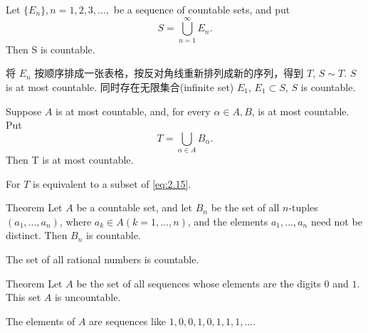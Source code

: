 
\begin{thm}\label{thm:2.12 countable set}
    Let $\{E_n\}, n=1,2,3,...,$ be a sequence of countable sets, and put
    \begin{equation}\label{eq:2.15}
        S = \bigcup_{n=1}^{\infty} E_n.
    \end{equation}
    Then S is countable.
\end{thm}

将 $E_n$ 按顺序排成一张表格，按反对角线重新排列成新的序列，得到 $T$, $S\sim T$.
$S$ is at most countable.
同时存在无限集合(infinite set) $E_1$, $E_1 \subset S$, $S$ is countable.

\begin{myCorollary}
    Suppose $A$ is at most countable, and, for every $\alpha \in A, B$, is at most countable. Put
\begin{equation*}
    T = \bigcup_{\alpha\in A} B_\alpha.
\end{equation*}
Then T is at most countable.
\end{myCorollary}

For $T$ is equivalent to a subset of \ref{eq:2.15}.

\begin{thm}\label{thm:2.13 countable set of tuples}
    Theorem Let $A$ be a countable set, and let $B_n$ be the set of all $n$-tuples $(a_1, ...,a_n)$, where $a_k \in  A (k=1,...,n)$, and the elements $a_1, ...,a_n$ need not be distinct. Then $B_n$ is countable.
\end{thm}

\begin{myCorollary}
    The set of all rational numbers is countable.
\end{myCorollary}

\begin{thm}\label{thm:2.14}
    Theorem Let $A$ be the set of all sequences whose elements are the digits $0$ and $1$. This set $A$ is uncountable. 
\end{thm}

The elements of $A$ are sequences like $1, 0, 0, 1, 0, 1, 1, 1, ... .$